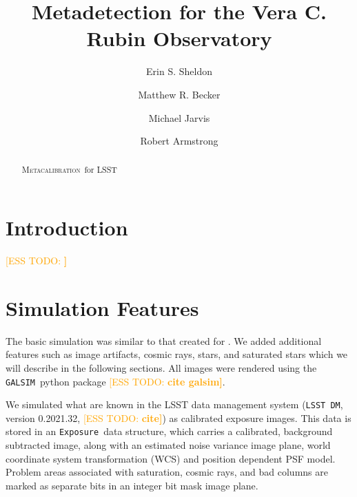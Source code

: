 \documentclass[twocolumn,twocolappendix,astrosym]{openjournal}
\newcommand{\esstodo}[1]{\textcolor{orange}{[ESS TODO: \bf #1]}}
\newcommand{\galsim}{\texttt{GALSIM}}
\newcommand{\calexp}{\texttt{Exposure}}
\newcommand{\dm}{\texttt{LSST DM}}
\newcommand{\Mcal}{\textsc{Metacalibration}}
\newcommand{\Mdet}{\textsc{Metadetection}}
\begin{document}



\title{Metadetection for the Vera C. Rubin Observatory}

\author{Erin S. Sheldon}
\author{Matthew R. Becker}
\author{Michael Jarvis}
\author{Robert Armstrong}


\begin{abstract}

    \Mcal\ for LSST

\end{abstract}


\section{Introduction} \label{sec:intro}

\esstodo{}

\section{Simulation Features} \label{sec:sim}

The basic simulation was similar to that created for \citep{mdet20}.  We added
additional features such as image artifacts, cosmic rays, stars, and saturated
stars which we will describe in the following sections.  All images were
rendered using the \galsim\ python package \esstodo{ cite galsim}.

We simulated what are known in the LSST data management system (\dm, version
0.2021.32, \esstodo{cite}) as calibrated exposure images.  This data is stored
in an \calexp\ data structure, which carries a calibrated, background subtracted
image, along with an estimated noise variance image plane, world coordinate
system transformation (WCS) and position dependent PSF model.  Problem areas
associated with saturation, cosmic rays, and bad columns are marked as separate
bits in an integer bit mask image plane.
\end{document}

